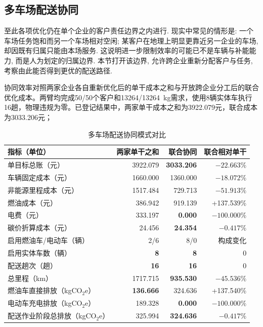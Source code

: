 \documentclass{setp-new}
\begin{document}
\subsection{多车场配送协同}

至此各项优化仍在单个企业的客户责任边界之内进行.
现实中常见的情形是: 一个车场任务饱和而另一个车场相对空闲;
某客户在地理上明显更靠近另一企业的车场, 却因既有归属只能由本场服务.
这说明进一步限制效率的可能已不是车辆与补能能力, 而是人为划定的归属边界.
本节打开该边界, 允许跨企业重新分配客户与任务, 考察由此能否得到更优的配送路径.

协同效率对照两家企业各自重新优化后的单干成本之和与开放跨企业分工后的联合优化成本。两臂均完成50/50个客户和13264/13264~kg需求，使用8辆实体车执行16趟，物理违规为零。已登记结果中，两家单干成本之和为3922.079元，联合成本为3033.206元；

\begin{table}[htbp]
  \centering
  \caption{多车场配送协同模式对比}
  \label{tab:synergy}
  \scriptsize
  \begin{tabular}{lrrr}
    \toprule
    指标（单位） & 两家单干之和 & 联合协同 & 联合相对单干\\
    \midrule
    单目标总账（元） & 3922.079 & \textbf{3033.206} & $-22.663\%$\\
    车辆固定成本（元） & 1660.000 & 1360.000 & $-18.072\%$\\
    非能源里程成本（元） & 1517.484 & 729.713 & $-51.913\%$\\
    燃油成本（元） & 386.942 & 919.139 & +137.539\%\\
    电费（元） & 333.197 & \textbf{0.000} & $-100.000\%$\\
    碳价折算成本（元） & 24.456 & \textbf{24.354} & $-0.417\%$\\
    启用燃油车/电动车（辆） & 2/6 & 8/0 & 构成变化\\
    启用实体车数（辆） & \textbf{8} & \textbf{8} & 0\\
    配送趟次（趟） & \textbf{16} & \textbf{16} & 0\\
    总里程（km） & 1717.715 & \textbf{935.530} & $-45.536\%$\\
    燃油车直接排放（kgCO$_2$e） & \textbf{136.666} & 324.636 & +137.540\%\\
    电动车充电排放（kgCO$_2$e） & 189.328 & \textbf{0.000} & $-100.000\%$\\
    配送作业阶段总排放（kgCO$_2$e） & 325.994 & \textbf{324.636} & $-0.417\%$\\
    \bottomrule
  \end{tabular}
\end{table}
\end{document}
